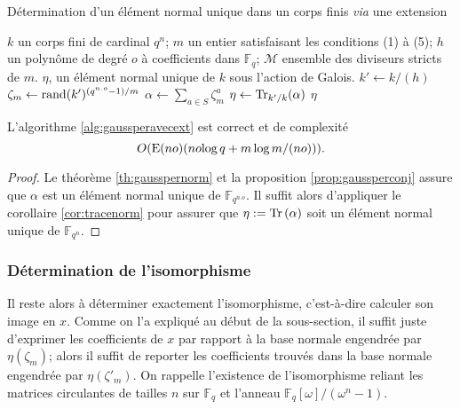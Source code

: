 \documentclass[a4paper]{article} %
\numberwithin{section}{part}
\numberwithin{equation}{section}
\newcommand\GF[1]{\mathbb{F}_{#1}}
\newcommand\Tr[1]{\textup{Tr}\left(#1\right)}
\newcommand\E[1]{\textup{E}(#1)}
\begin{document}
\begin{algorithm}
\caption{Détermination d'un élément normal unique dans un corps finis
\textit{via} une extension}
\label{alg:gaussperavecext}
\begin{algorithmic}[1]
\REQUIRE $k$ un corps fini de cardinal $q^n$; $m$ un entier satisfaisant les 
conditions (1) à (5); $h$ un polynôme de degré $o$ à coefficients dans $\GF{q}$;
$\mathcal{M}$ ensemble des diviseurs stricts de
$m$.
\ENSURE $\eta$, un élément normal unique de $k$ sous l'action de Galois.
\bigskip
\STATE $k' \leftarrow k/(h)$
\REPEAT
    \STATE $\zeta_m \leftarrow \textup{rand}(k')^{(q^{n.o} - 1)/m}$
\STATE $\alpha \leftarrow \sum_{a\in S}{\zeta_m^a}$
\STATE $\eta \leftarrow \textup{Tr}_{k'/k}(\alpha)$
\RETURN $\eta$
\end{algorithmic}
\end{algorithm}
\begin{prop} 
\label{prop:algavecext}
L'algorithme \ref{alg:gaussperavecext} est correct et de complexité
\begin{equation}
O(\E{no}(no\textup{log\,}q + m\,\textup{log\,}m/(no))).
\end{equation}
\end{prop}
\begin{proof}
Le théorème \ref{th:gausspernorm} et la proposition \ref{prop:gaussperconj}
assure que $\alpha$ est un élément normal unique de $\GF{q^{n.o}}$. Il suffit 
alors d'appliquer le corollaire \ref{cor:tracenorm} pour assurer que $\eta :=
\Tr{\alpha}$ soit un élément normal unique de $\GF{q^n}$.
\end{proof}

\subsubsection*{Détermination de l'isomorphisme}
Il reste alors à déterminer exactement l'isomorphisme, c'est-à-dire calculer son
image en $x$. Comme on l'a expliqué au début de la sous-section, il suffit juste
d'exprimer les coefficients de $x$ par rapport à la base normale engendrée par
$\eta(\zeta_m)$; alors il suffit de reporter les coefficients 
trouvés dans la base normale engendrée par $\eta(\zeta'_m)$. On rappelle
l'existence de l'isomorphisme reliant les matrices circulantes de tailles $n$ 
sur $\GF{q}$ et l'anneau $\GF{q}[\omega]/(\omega^n - 1)$.
\end{document}
